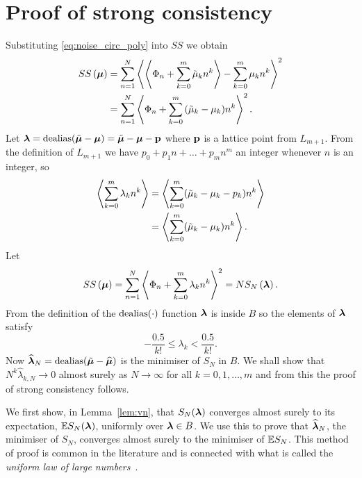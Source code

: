 \documentclass[journal]{IEEEtran}
\begin{document}
\section{Proof of strong consistency}\label{sec:strongconstproof}
 Substituting \eqref{eq:noise_circ_poly} into $SS$ we obtain
 \begin{align*}
SS\left( \boldsymbol{\mu} \right) &= \sum_{n=1}^{N}\left\langle  \left\langle  \Phi_n + \sum_{k = 0}^{m}{\tilde{\mu}_k n^k}  \right\rangle - \sum_{k = 0}^{m}{\mu_k n^k}  \right\rangle^{2} \\
&= \sum_{n=1}^{N}\left\langle   \Phi_n + \sum_{k = 0}^{m}{(\tilde{\mu}_k - \mu_k) n^k}  \right\rangle^{2}.
\end{align*}
Let $\boldsymbol{\lambda} = \operatorname{dealias}(\tilde{\boldsymbol{\mu}} - \boldsymbol{\mu}) = \tilde{\boldsymbol{\mu}} - \boldsymbol{\mu} - \mathbf{p}$ where $\mathbf{p}$ is a lattice point from $L_{m+1}$. From the definition of $L_{m+1}$ we have $p_0 + p_1 n + \dots + p_{m} n^m$ an integer whenever $n$ is an integer, so
\begin{align*}
\left\langle \sum_{k=0}^{m}\lambda_k n^k  \right\rangle &= \left\langle \sum_{k=0}^{m}(\tilde{\mu}_k - \mu_k - p_k) n^k  \right\rangle \\
&= \left\langle \sum_{k=0}^{m}(\tilde{\mu}_k - \mu_k) n^k  \right\rangle.
\end{align*}
Let
\[
SS\left( \boldsymbol{\mu} \right) = \sum_{n=1}^{N}\left\langle   \Phi_n + \sum_{k = 0}^{m}{\lambda_k n^k}  \right\rangle  ^{2} = N S_{N}\left( \boldsymbol{\lambda} \right).
 \]
From the definition of the $\operatorname{dealias}(\cdot)$ function $\boldsymbol{\lambda}$ is inside $B$ so the elements of $\boldsymbol{\lambda}$ satisfy
 \begin{equation} \label{eq:identifiability}
 -\frac{0.5}{k!} \leq \lambda_k < \frac{0.5}{k!}.
 \end{equation} 
Now $\widehat{\boldsymbol{\lambda}}_N = \operatorname{dealias}(\tilde{\boldsymbol{\mu}} - \widehat{\boldsymbol{\mu}})$ is the minimiser of $S_{N}$ in $B$. We shall show that $N^k\widehat{\lambda}_{k,N}\rightarrow0$ almost surely as $N\rightarrow\infty$ for all $k = 0,1, \dots, m$ and from this the proof of strong consistency follows. 
 
We first show, in Lemma~\ref{lem:vn}, that $S_N(\boldsymbol{\lambda})$ converges almost surely to its expectation, ${\mathbb E} S_N(\boldsymbol{\lambda})$,  uniformly over $\boldsymbol{\lambda} \in B$.  We use this to prove that $\widehat{\boldsymbol{\lambda}}_N$, the minimiser of $S_N$, converges almost
surely to the minimiser of ${\mathbb E} S_N$. %
This method of proof is common in the literature and is connected with what is called the \emph{uniform law of large numbers}~\cite{Pollard_conv_stat_proc_1984,Pollard_asymp_empi_proc_1989}.
\end{document}
